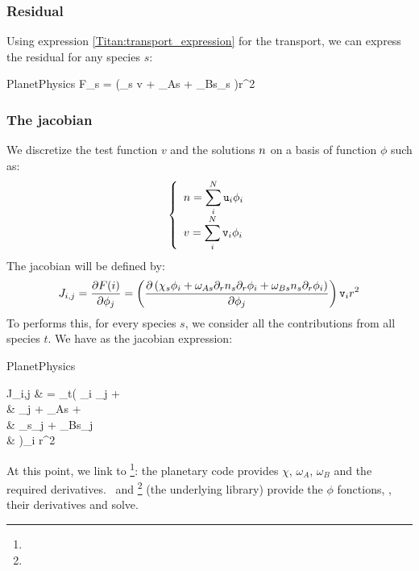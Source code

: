 \subsubsection{Residual}

Using expression \ref{Titan:transport_expression} for the transport, we can
express the residual for any species $s$:
\begin{equationCode}{PlanetPhysics}
F_s = \left(\chi_s v + \omega_{As} + \omega_{Bs}\conc_s \right)r^2
\end{equationCode}

\subsubsection{The jacobian}

We discretize the test function $v$ and the solutions $n$ on
a basis of function $\phi$ such as:
\[
  \left\{\begin{array}{l}
         n = \displaystyle\sum_i^N \mathtt{u}_i\phi_i \\[5pt]
         v     = \displaystyle\sum_i^N \mathtt{v}_i\phi_i \\
         \end{array}\right.
\]
%
The jacobian will be defined by:
\[
J_{i,j} = \frac{\partial F(i)}{\partial\phi_j} = 
        \left(\frac{\partial\left(\chi_s \phi_i + \omega_{As}\partial_{r}{n_s}\partial_{r}{\phi_i} + \omega_{Bs}n_s\partial_{r}{\phi_i}\right)}{\partial\phi_j} \right) \mathtt{v}_i r^2 
\]
%
To performs this, for every species $s$, we consider all the contributions
from all species $t$. We have as the jacobian expression:
\begin{equationCode}{PlanetPhysics}
\begin{split}
J_{i,j} & = \sum_t\Bigg( \phi_i \phi_j +  \\  
        & \hphantom{= \sum_t\Bigg(}
            \phi_j + 
            \omega_{As}  + \\ 
        & \hphantom{= \sum_t\Bigg(}
             \conc_s\phi_j +
            \omega_{Bs}\phi_j  \\
        & \hphantom{= \sum_t\Bigg(} \Bigg)\vi_i r^2 
\end{split}
\end{equationCode}

At this point, we link to \GRINS\footnote{\GitGrins}: the planetary code provides $\chi$,
$\omega_A$, $\omega_B$ and the required derivatives. \GRINS\ and \LibMesh\footnote{\GitLibmesh} (the underlying library)
provide the $\phi$ fonctions, \conc, their derivatives and solve.
